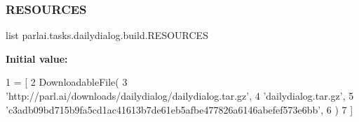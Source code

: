 \subsubsection{\texorpdfstring{R\+E\+S\+O\+U\+R\+C\+ES}{RESOURCES}}
{\footnotesize\ttfamily list parlai.\+tasks.\+dailydialog.\+build.\+R\+E\+S\+O\+U\+R\+C\+ES}

{\bfseries Initial value\+:}
\begin{DoxyCode}
1 =  [
2     DownloadableFile(
3         \textcolor{stringliteral}{'http://parl.ai/downloads/dailydialog/dailydialog.tar.gz'},
4         \textcolor{stringliteral}{'dailydialog.tar.gz'},
5         \textcolor{stringliteral}{'c3adb09bd715b9fa5cd1ac41613b7de61eb5afbe477826a6146abefef573e6bb'},
6     )
7 ]
\end{DoxyCode}

